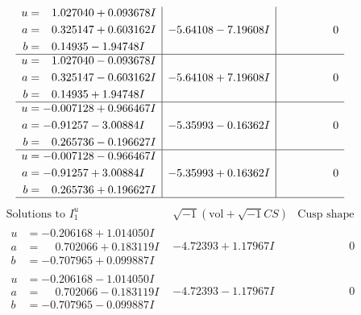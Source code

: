 \documentclass[1p]{elsarticle_modified}
\theoremstyle{definition}
\newcommand{\I}{\sqrt{-1}}
\begin{document}
$$\begin{array}{c|c|c}
\begin{aligned}
u &= \phantom{-}1.027040 + 0.093678 I \\
a &= \phantom{-}0.325147 + 0.603162 I \\
b &= \phantom{-}0.14935 - 1.94748 I\end{aligned}
 & -5.64108 - 7.19608 I & \phantom{-0.000000 } 0 \\ \hline\begin{aligned}
u &= \phantom{-}1.027040 - 0.093678 I \\
a &= \phantom{-}0.325147 - 0.603162 I \\
b &= \phantom{-}0.14935 + 1.94748 I\end{aligned}
 & -5.64108 + 7.19608 I & \phantom{-0.000000 } 0 \\ \hline\begin{aligned}
u &= -0.007128 + 0.966467 I \\
a &= -0.91257 - 3.00884 I \\
b &= \phantom{-}0.265736 - 0.196627 I\end{aligned}
 & -5.35993 - 0.16362 I & \phantom{-0.000000 } 0 \\ \hline\begin{aligned}
u &= -0.007128 - 0.966467 I \\
a &= -0.91257 + 3.00884 I \\
b &= \phantom{-}0.265736 + 0.196627 I\end{aligned}
 & -5.35993 + 0.16362 I & \phantom{-0.000000 } 0\\
 \hline 
 \end{array}$$\newpage$$\begin{array}{c|c|c}  
\text{Solutions to }I^u_{1}& \I (\text{vol} + \sqrt{-1}CS) & \text{Cusp shape}\\
 \hline 
\begin{aligned}
u &= -0.206168 + 1.014050 I \\
a &= \phantom{-}0.702066 + 0.183119 I \\
b &= -0.707965 + 0.099887 I\end{aligned}
 & -4.72393 + 1.17967 I & \phantom{-0.000000 } 0 \\ \hline\begin{aligned}
u &= -0.206168 - 1.014050 I \\
a &= \phantom{-}0.702066 - 0.183119 I \\
b &= -0.707965 - 0.099887 I\end{aligned}
 & -4.72393 - 1.17967 I & \phantom{-0.000000 } 0 \\ \hline\begin{aligned}

\end{aligned}
\end{array}$$
\end{document}
